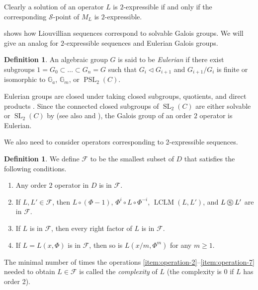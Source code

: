 \documentclass[11pt,reqno]{amsart}
\theoremstyle{definition}
\newtheorem{definition}[theorem]{Definition}
\DeclareMathOperator{\LCLM}{LCLM}
\DeclareMathOperator{\SL}{SL}
\DeclareMathOperator{\PSL}{PSL}
\newcommand{\cs}{\mathbin{\circledS}}
\begin{document}
Clearly a solution of an operator $L$ is $2$-expressible if and only if the corresponding $\mathcal{S}$-point of $M_{L}$ is $2$-expressible.

\cite[Theorem 3.4]{hendricks1999solving} shows how Liouvillian sequences correspond to solvable Galois groups.
We will give an analog for $2$-expressible sequences and Eulerian Galois groups.
\begin{definition}\cite[page 667]{singer1985solving} An algebraic group $G$ is said to be \emph{Eulerian} if there exist subgroups $1=G_{0}\subset \dots \subset G_{n}=G$ such that
$G_{i}\triangleleft G_{i+1}$ and $G_{i+1}/G_{i}$ is finite or isomorphic to $\mathbb{G}_{a}$, $\mathbb{G}_{m}$, or $\PSL_{2}(C)$.\end{definition} 
Eulerian groups are closed under taking closed subgroups, quotients, and direct products \cite[Lemma 2.2]{singer1985solving}. 
Since the connected closed subgroups of $\SL_{2}(C)$ are either solvable or $\SL_{2}(C)$ by \cite[page 31]{kaplansky1957introduction} (see also \cite[page 7]{kovacic1986algorithm} and \cite[page 28]{put2003galois}), 
the Galois group of an order $2$ operator is Eulerian.

We also need to consider operators corresponding to 2-expressible sequences. 

\begin{definition}\label{def:fully-2-solvable-operator}
    We define $\mathcal{F}$ to be the smallest subset of $D$ that satisfies the following conditions.
    \begin{enumerate}[label=(\roman*)]
        \item\label{item:operation-1} Any order $2$ operator in $D$ is in $\mathcal{F}$.
        \item\label{item:operation-2} If $L,L'\in \mathcal{F}$, then $L \circ (\Phi - 1)$, $\Phi^{i}\circ L \circ \Phi^{-i}$, $\LCLM(L,L')$, and $L\cs L'$ are in $\mathcal{F}$.
        \item\label{item:operation-6} If $L$ is in $\mathcal{F}$, then every right factor of $L$ is in $\mathcal{F}$.
        \item\label{item:operation-7} If $L = L(x, \Phi)$ is in $\mathcal{F}$, then so is $L(x/m, \Phi^m)$ for any $m \ge 1$.
    \end{enumerate}
    The minimal number of times the operations \ref{item:operation-2}--\ref{item:operation-7} %
    needed
    to obtain $L\in \mathcal{F}$ is called the \emph{complexity} of $L$ (the complexity is 0 if $L$ has order 2).
\end{definition}
\end{document}

